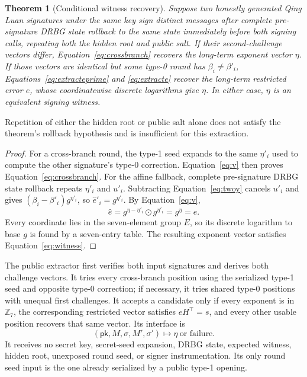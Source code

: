 \documentclass[11pt,a4paper]{article}
\newtheorem{theorem}{Theorem}
\newcommand{\Z}{\mathbb Z}
\newcommand{\pk}{\ensuremath{\mathsf{pk}}}
\begin{document}
\begin{theorem}[Conditional witness recovery]
Suppose two honestly generated Qing Luan signatures under the same key sign
distinct messages after complete pre-signature DRBG state rollback to the same
state immediately before both signing calls, repeating both the hidden root and
public salt.  If their
second-challenge vectors differ, Equation~\eqref{eq:crossbranch} recovers the
long-term exponent vector $\eta$.  If those vectors are identical but some
type-0 round has $\beta_i\ne\beta'_i$,
Equations~\eqref{eq:extracteprime} and \eqref{eq:extracte} recover the
long-term restricted error $e$, whose coordinatewise discrete logarithms give
$\eta$.  In either case, $\eta$ is an equivalent signing witness.
\end{theorem}

Repetition of either the hidden root or public salt alone does not satisfy the
theorem's rollback hypothesis and is insufficient for this extraction.

\begin{proof}
For a cross-branch round, the type-1 seed expands to the same $\eta'_i$ used
to compute the other signature's type-0 correction.  Equation~\eqref{eq:v}
then proves Equation~\eqref{eq:crossbranch}.  For the affine fallback,
complete pre-signature DRBG state rollback repeats $\eta'_i$ and $u'_i$.
Subtracting
Equation~\eqref{eq:twoy} cancels $u'_i$ and gives
$(\beta_i-\beta'_i)g^{\eta'_i}$, so
$\widehat e'_i=g^{\eta'_i}$.  By Equation~\eqref{eq:v},
\[
 \widehat e=g^{\eta-\eta'_i}\odot g^{\eta'_i}=g^\eta=e.
\]
Every coordinate lies in the seven-element group $E$, so its discrete
logarithm to base $g$ is found by a seven-entry table.  The resulting exponent
vector satisfies Equation~\eqref{eq:witness}.
\end{proof}

The public extractor first verifies both input signatures and derives both
challenge vectors.  It tries every cross-branch position using the serialized
type-1 seed and opposite type-0 correction; if necessary, it tries shared
type-0 positions with unequal first challenges.  It accepts a candidate only
if every exponent is in $\Z_7$, the corresponding restricted vector satisfies
$eH^\top=s$, and every other usable position recovers that same vector.  Its
interface is
\[
       (\pk,M,\sigma,M',\sigma')\longmapsto\eta\ \text{or failure}.
\]
It receives no secret key, secret-seed expansion, DRBG state, expected witness,
hidden root, unexposed round seed, or signer instrumentation.  Its only round
seed input is the one already serialized by a public type-1 opening.
\end{document}
